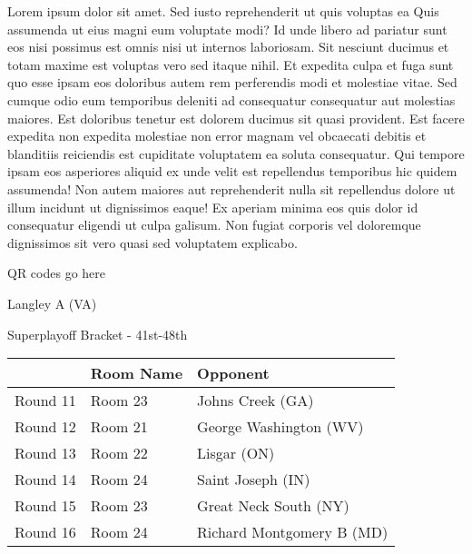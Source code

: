 \documentclass{article}%
\begin{document}
\vspace*{8pt}%
\linebreak%
\newline%
\newline%
    Lorem ipsum dolor sit amet. Sed iusto reprehenderit ut quis voluptas ea Quis assumenda ut eius magni eum voluptate modi? Id unde libero ad pariatur sunt eos nisi possimus est omnis nisi ut internos laboriosam. Sit nesciunt ducimus et totam maxime est voluptas vero sed itaque nihil. Et expedita culpa et fuga sunt quo esse ipsam eos doloribus autem rem perferendis modi et molestiae vitae.\newline%
\newline%
    Sed cumque odio eum temporibus deleniti ad consequatur consequatur aut molestias maiores. Est doloribus tenetur est dolorem ducimus sit quasi provident. Est facere expedita non expedita molestiae non error magnam vel obcaecati debitis et blanditiis reiciendis est cupiditate voluptatem ea soluta consequatur. Qui tempore ipsam eos asperiores aliquid ex unde velit est repellendus temporibus hic quidem assumenda!\newline%
\newline%
    Non autem maiores aut reprehenderit nulla sit repellendus dolore ut illum incidunt ut dignissimos eaque! Ex aperiam minima eos quis dolor id consequatur eligendi ut culpa galisum. Non fugiat corporis vel doloremque dignissimos sit vero quasi sed voluptatem explicabo.\newline%
\newline%
\vspace*{30pt}%
\begin{center}%
\begin{Huge}%
QR codes go here%
\end{Huge}%
\end{center}%
\newpage%
\begin{center}%
\begin{Huge}%
Langley A (VA)%
\end{Huge}%
\vspace*{8pt}%
\linebreak%
\begin{Large}%
Superplayoff Bracket {-} 41st{-}48th%
\end{Large}%
\end{center}%
%
\begin{tabularx}{\textwidth}{|c|Y|Y|}%
\hline%
&Room Name&Opponent\\%
\hline%
Round 11&Room 23&Johns Creek (GA)\\%
Round 12&Room 21&George Washington (WV)\\%
Round 13&Room 22&Lisgar (ON)\\%
Round 14&Room 24&Saint Joseph (IN)\\%
Round 15&Room 23&Great Neck South (NY)\\%
Round 16&Room 24&Richard Montgomery B (MD)\\%
\hline%
\end{tabularx}%
\end{document}
